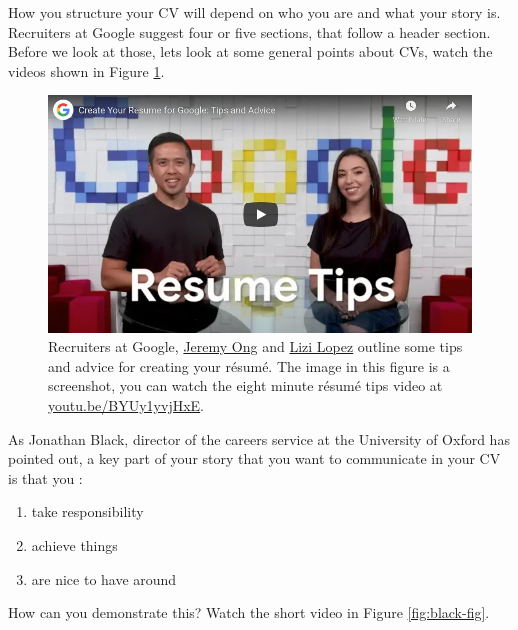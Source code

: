 \documentclass[
]{book}
\providecommand{\tightlist}{%
  \setlength{\itemsep}{0pt}\setlength{\parskip}{0pt}}
\begin{document}
How you structure your CV will depend on who you are and what your story is. Recruiters at Google suggest four or five sections, that follow a header section. Before we look at those, lets look at some general points about CVs, watch the videos shown in Figure \ref{fig:lopez-fig}.

\begin{figure}

{\centering \includegraphics[width=0.99\linewidth]{images/youtube-google-recruiters} 

}

\caption{Recruiters at Google, \href{https://www.linkedin.com/in/jeremy-ong/}{Jeremy Ong} and \href{https://www.linkedin.com/in/lizilopez/}{Lizi Lopez} outline some tips and advice for creating your résumé. \citep{youtube-google-recruiters} The image in this figure is a screenshot, you can watch the eight minute résumé tips video at \href{https://youtu.be/BYUy1yvjHxE}{youtu.be/BYUy1yvjHxE}.}\label{fig:lopez-fig}
\end{figure}



As Jonathan Black, director of the careers service at the University of Oxford has pointed out, \citep{topnotchcv} a key part of your story that you want to communicate in your CV is that you :

\begin{enumerate}
\def\labelenumi{\arabic{enumi}.}
\tightlist
\item
  take responsibility
\item
  achieve things
\item
  are nice to have around
\end{enumerate}

How can you demonstrate this? Watch the short video in Figure \ref{fig:black-fig}.
\end{document}
